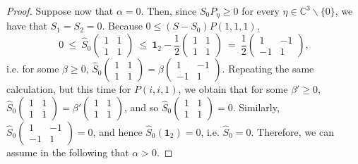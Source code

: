 \documentclass[12pt]{article}
\theoremstyle{plain}
\theoremstyle{definition}
\theoremstyle{remark}
\numberwithin{equation}{section}
\begin{document}
\begin{proof}
Suppose now that $\alpha = 0$.
Then, since $S_{0} P_{\eta} \geq 0$ for every
$\eta \in \mathbb{C}^{3}\backslash\{0\}$,
we have that $S_{1} = S_{2} = 0$.
Because 
$0 \leq (S - S_{0}) P(1,1,1)$,
\begin{equation}
0 \: \leq \: \hat{S}_{0} \begin{pmatrix}
    1 & 1 \\ 1 & 1
    \end{pmatrix} \: \leq \:
    \mathbf{1}_{2} - \frac{1}{2} \begin{pmatrix}
                1 & 1 \\ 1 & 1
                \end{pmatrix} \: = \:
    \frac{1}{2}
    \begin{pmatrix}
    1 & -1 \\ -1 & 1
    \end{pmatrix},
\end{equation}
i.e. for some $\beta \geq 0$, 
$
\hat{S}_{0} \left( \begin{smallmatrix}
    1 & 1 \\ 1 & 1
    \end{smallmatrix} \right) =
    \beta \left(
    \begin{smallmatrix}
    1 & -1 \\ -1 & 1
    \end{smallmatrix} \right)
$.
Repeating the same calculation, but this time for $P(i,i,1)$,
we obtain that for some $\beta' \geq 0$, 
$
\hat{S}_{0} \left( \begin{smallmatrix}
    1 & 1 \\ 1 & 1
    \end{smallmatrix} \right) =
    \beta' \left(
    \begin{smallmatrix}
    1 & 1 \\ 1 & 1
    \end{smallmatrix} \right)
$,
and so 
$
\hat{S}_{0} \left( \begin{smallmatrix}
    1 & 1 \\ 1 & 1
    \end{smallmatrix} \right) = 0
$.
Similarly,
$
\hat{S}_{0} \left( \begin{smallmatrix}
    1 & -1 \\ -1 & 1
    \end{smallmatrix} \right) = 0
$, and hence
$\hat{S}_{0}(\mathbf{1}_{2}) = 0$, i.e. $\hat{S}_{0} = 0$.
Therefore,  we can assume in the following that $\alpha > 0$.


\end{proof}
\end{document}
